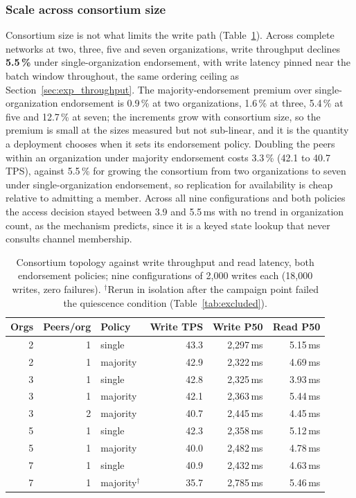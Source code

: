 \documentclass[preprint,12pt]{elsarticle}
\begin{document}
\subsubsection{Scale across consortium size}
\label{sec:exp_netscale}

Consortium size is not what limits the write path (Table~\ref{tab:netscale}).
Across complete networks at
two, three, five and seven organizations, write throughput declines
\textbf{5.5\,\%} under single-organization endorsement, with write latency
pinned near the batch window throughout, the same ordering ceiling as
Section~\ref{sec:exp_throughput}. The majority-endorsement premium over
single-organization endorsement is 0.9\,\% at two organizations, 1.6\,\% at
three, 5.4\,\% at five and 12.7\,\% at seven; the increments grow with
consortium size, so the premium is small at the sizes measured but not
sub-linear, and it is the quantity a deployment chooses when it sets
its endorsement policy. Doubling the peers within an organization under
majority endorsement costs 3.3\,\% (42.1 to 40.7\,TPS), against 5.5\,\% for
growing the consortium from two organizations to seven under
single-organization endorsement, so replication for
availability is cheap relative to admitting a member. Across all nine
configurations and both policies the access decision stayed between 3.9 and
5.5\,ms with no trend in organization count, as the mechanism predicts, since
it is a keyed state lookup that never consults channel membership.

\begin{table}[!t]
\centering
\caption{Consortium topology against write throughput and read latency,
both endorsement policies; nine configurations of 2{,}000 writes each
(18{,}000 writes, zero failures). $^{\dagger}$Rerun in isolation after the
campaign point failed the quiescence condition (Table~\ref{tab:excluded}).}
\label{tab:netscale}
\footnotesize
\setlength{\tabcolsep}{5pt}
\begin{tabular}{@{}rrlrrr@{}}
\toprule
Orgs & Peers/org & Policy & Write TPS & Write P50 & Read P50 \\
\midrule
2 & 1 & single   & 43.3 & 2{,}297\,ms & 5.15\,ms \\
2 & 1 & majority & 42.9 & 2{,}322\,ms & 4.69\,ms \\
3 & 1 & single   & 42.8 & 2{,}325\,ms & 3.93\,ms \\
3 & 1 & majority & 42.1 & 2{,}363\,ms & 5.44\,ms \\
3 & 2 & majority & 40.7 & 2{,}445\,ms & 4.45\,ms \\
5 & 1 & single   & 42.3 & 2{,}358\,ms & 5.12\,ms \\
5 & 1 & majority & 40.0 & 2{,}482\,ms & 4.78\,ms \\
7 & 1 & single   & 40.9 & 2{,}432\,ms & 4.63\,ms \\
7 & 1 & majority$^{\dagger}$ & 35.7 & 2{,}785\,ms & 5.46\,ms \\
\bottomrule
\end{tabular}
\end{table}
\end{document}
